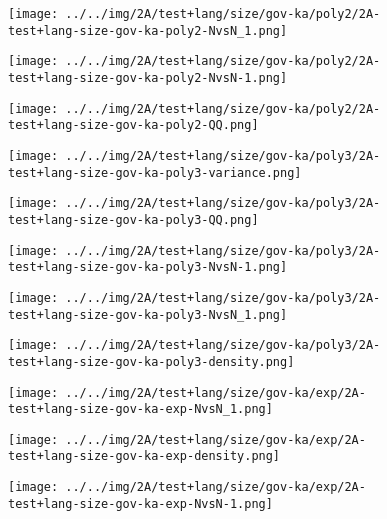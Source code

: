 \begin{figure}[H]
\centering	\texttt{[image: ../../img/2A/test+lang/size/gov-ka/poly2/2A-test+lang-size-gov-ka-poly2-NvsN\_1.png]}
\end{figure}
\begin{figure}[H]
\centering	\texttt{[image: ../../img/2A/test+lang/size/gov-ka/poly2/2A-test+lang-size-gov-ka-poly2-NvsN-1.png]}
\end{figure}
\begin{figure}[H]
\centering	\texttt{[image: ../../img/2A/test+lang/size/gov-ka/poly2/2A-test+lang-size-gov-ka-poly2-QQ.png]}
\end{figure}
\begin{figure}[H]
\centering	\texttt{[image: ../../img/2A/test+lang/size/gov-ka/poly3/2A-test+lang-size-gov-ka-poly3-variance.png]}
\end{figure}
\begin{figure}[H]
\centering	\texttt{[image: ../../img/2A/test+lang/size/gov-ka/poly3/2A-test+lang-size-gov-ka-poly3-QQ.png]}
\end{figure}
\begin{figure}[H]
\centering	\texttt{[image: ../../img/2A/test+lang/size/gov-ka/poly3/2A-test+lang-size-gov-ka-poly3-NvsN-1.png]}
\end{figure}
\begin{figure}[H]
\centering	\texttt{[image: ../../img/2A/test+lang/size/gov-ka/poly3/2A-test+lang-size-gov-ka-poly3-NvsN\_1.png]}
\end{figure}
\begin{figure}[H]
\centering	\texttt{[image: ../../img/2A/test+lang/size/gov-ka/poly3/2A-test+lang-size-gov-ka-poly3-density.png]}
\end{figure}
\begin{figure}[H]
\centering	\texttt{[image: ../../img/2A/test+lang/size/gov-ka/exp/2A-test+lang-size-gov-ka-exp-NvsN\_1.png]}
\end{figure}
\begin{figure}[H]
\centering	\texttt{[image: ../../img/2A/test+lang/size/gov-ka/exp/2A-test+lang-size-gov-ka-exp-density.png]}
\end{figure}
\begin{figure}[H]
\centering	\texttt{[image: ../../img/2A/test+lang/size/gov-ka/exp/2A-test+lang-size-gov-ka-exp-NvsN-1.png]}
\end{figure}

